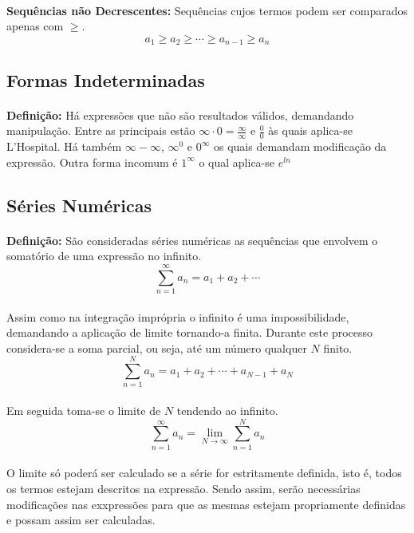 \documentclass{article}
\begin{document}
        \paragraph{}\textbf{Sequências não Decrescentes:} Sequências cujos termos podem ser comparados apenas com $\ge$.
            \[a_1\ge a_2\ge \cdots \ge a_{n-1} \ge a_n\]
            
    \subsection{Formas Indeterminadas}
        \paragraph{}\textbf{Definição:} Há expressões que não são resultados válidos, demandando manipulação. Entre as principais estão $\infty\cdot0=\frac{\infty}{\infty}$ e $\frac{0}{0}$ às quais aplica-se L'Hospital. Há também $\infty-\infty$, $\infty^0$ e $0^{\infty}$ os quais demandam modificação da expressão. Outra forma incomum é $1^{\infty}$ o qual aplica-se $e^{ln}$
    
    \subsection{Séries Numéricas}
        \paragraph{}\textbf{Definição:} São consideradas séries numéricas as sequências que envolvem o somatório de uma expressão no infinito.
        \[\sum\limits_{n=1}^{\infty}a_n = a_1 + a_2 + \cdots\]
        \paragraph{}Assim como na integração imprópria o infinito é uma impossibilidade, demandando a aplicação de limite tornando-a finita. Durante este processo considera-se a soma parcial, ou seja, até um número qualquer $N$ finito.
        \[\sum\limits_{n=1}^{N}a_n = a_1 + a_2 + \cdots + a_{N-1} + a_N\]
        \paragraph{}Em seguida toma-se o limite de $N$ tendendo ao infinito.
        \[\sum\limits_{n=1}^{\infty}a_n=\lim\limits_{N\to\infty}\sum\limits_{n=1}^{N}a_n\]
        \paragraph{}O limite só poderá ser calculado se a série for estritamente definida, isto é, todos os termos estejam descritos na expressão. Sendo assim, serão necessárias modificações nas exxpressões para que as mesmas estejam propriamente definidas e possam assim ser calculadas.
    
\end{document}
